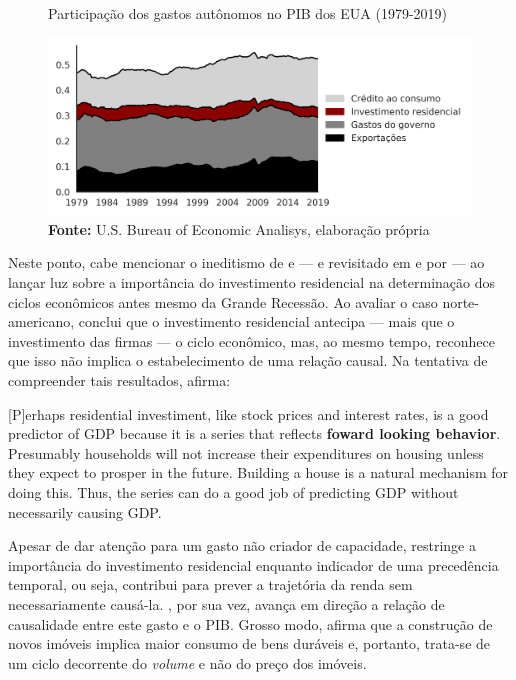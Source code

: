 \begin{figure}[H]
	\centering
	\caption{Participação dos gastos autônomos no PIB dos EUA (1979-2019)}
	\label{FigAutonomos}
	\includegraphics[width=\textwidth]{../../Dados/Fatos_Estilizados/figs/Gastos_autonomos.png}
	\caption*{\textbf{Fonte:} U.S. Bureau of Economic Analisys, elaboração própria}
\end{figure}

Neste ponto, cabe mencionar o ineditismo de \textcite{green_follow_1997} e \textcite{leamer_housing_2007} --- e revisitado em \textcite{leamer_housing_2015} e por \textcite{fiebiger_trend_2017} --- ao lançar luz sobre a importância do investimento residencial na determinação dos ciclos econômicos antes mesmo da Grande Recessão. 
Ao avaliar o caso norte-americano, \textcite{green_follow_1997} conclui que o
investimento residencial antecipa --- mais que o investimento das firmas --- o ciclo econômico, mas, ao mesmo tempo, reconhece que isso não implica o estabelecimento de uma relação causal. Na tentativa de compreender tais resultados, afirma:

\begin{citacao}
	
	[P]erhaps residential investiment, like stock prices and interest rates, is a good predictor of GDP because it is a series that reflects \textbf{foward looking behavior}. Presumably households will not increase their expenditures on housing unless they expect to prosper in the future. Building a house is a natural mechanism for doing this. Thus, the series can do a good job of predicting GDP without necessarily causing GDP.
	\cite[p.~267, grifos adicionados]{green_follow_1997}
\end{citacao}
Apesar de dar atenção para um gasto não criador de capacidade, \textcite{green_follow_1997} restringe a importância do investimento residencial enquanto indicador de uma precedência temporal, ou seja, contribui para prever a trajetória da renda sem necessariamente causá-la.
\textcite{leamer_housing_2007}, por sua vez, avança em direção a relação de causalidade entre este gasto e o PIB. Grosso modo, afirma que a construção de novos imóveis implica maior consumo de bens duráveis e, portanto, trata-se de um ciclo decorrente do \textit{volume} e não do preço dos imóveis. 

